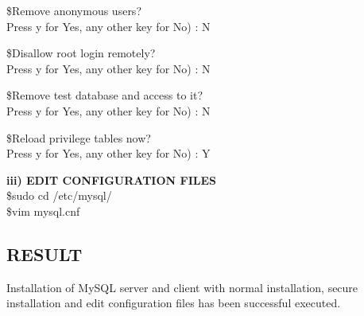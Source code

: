 \documentclass{article}
\begin{document}
\begin{flushleft}
\hspace{0.6in}\$Remove anonymous users?\\ \vspace{0.1in}\hspace{0.7in}Press y for Yes, any other key for No) : N

\hspace{0.6in}\$Disallow root login remotely?\\ \vspace{0.1in}\hspace{0.7in}Press y for Yes, any other key for No) : N

\hspace{0.6in}\$Remove test database and access to it?\\ \vspace{0.1in}\hspace{0.7in}Press y for Yes, any other key for No) : N

\hspace{0.6in}\$Reload privilege tables now?\\ \vspace{0.1in}\hspace{0.7in}Press y for Yes, any other key for No) : Y\\ \vspace{0.1in}

\textbf{{\normalsize iii) EDIT CONFIGURATION FILES}}
\\ \vspace{0.1in}
\hspace{0.6in} \$sudo cd /etc/mysql/\\ 
\hspace{0.6in} \$vim mysql.cnf\\

\subsection{RESULT}
Installation of MySQL server and client with normal installation, secure installation and edit configuration files has been successful executed.


\end{flushleft}
\end{document}
